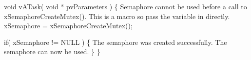 \begin{DoxyPre} void vATask( void * pvParameters )
 \{
Semaphore cannot be used before a call to xSemaphoreCreateMutex().
This is a macro so pass the variable in directly.
    xSemaphore = xSemaphoreCreateMutex();\end{DoxyPre}



\begin{DoxyPre}    if( xSemaphore != NULL )
    \{
The semaphore was created successfully.
The semaphore can now be used.
    \}
 \}
 \end{DoxyPre}
 